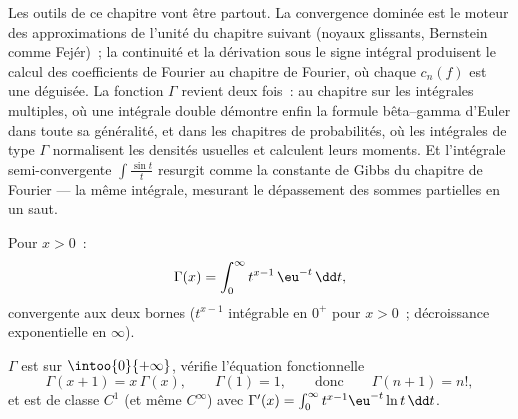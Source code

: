 \begin{remark}
Les outils de ce chapitre vont être partout. La convergence
dominée est le moteur des approximations de l'unité du
chapitre suivant (noyaux glissants, Bernstein comme Fejér)~;
la continuité et la dérivation sous le signe intégral
produisent le calcul des coefficients de Fourier au chapitre de Fourier,
où chaque $c_n(f)$ est une  déguisée. La fonction $\Gamma$
revient deux fois~: au chapitre sur les intégrales multiples, où une
intégrale double démontre enfin la formule bêta--gamma d'Euler dans
toute sa généralité, et dans les chapitres de probabilités, où les
intégrales de type $\Gamma$ normalisent les densités usuelles et
calculent leurs moments. Et l'intégrale semi-convergente
$\int\frac{\sin t}{t}$ resurgit comme la constante de Gibbs du
chapitre de Fourier --- la même intégrale, mesurant le dépassement
des sommes partielles en un saut.
\end{remark}

\begin{definition}\label{def:b2:integration:gamma}
Pour $x > 0$~:
\[
\Gamma(x) = \int_0^{\infty} t^{x-1}\,\eu^{-t}\,\dd t ,
\]
convergente aux deux bornes ($t^{x-1}$ intégrable en $0^+$ pour $x > 0$~;
décroissance exponentielle en $\infty$).
\end{definition}

\begin{theorem}\label{thm:b2:integration:gammaprops}
$\Gamma$ est  sur $\intoo{0}{+\infty}$, vérifie l'équation
fonctionnelle
\[
\Gamma(x + 1) = x\,\Gamma(x),
\qquad \Gamma(1) = 1,
\qquad\text{donc}\qquad \Gamma(n + 1) = n! ,
\]
et est de classe $C^1$ (et même $C^\infty$) avec $\Gamma'(x) =
\int_0^\infty t^{x-1}\eu^{-t}\ln t\,\dd t$.
\end{theorem}

